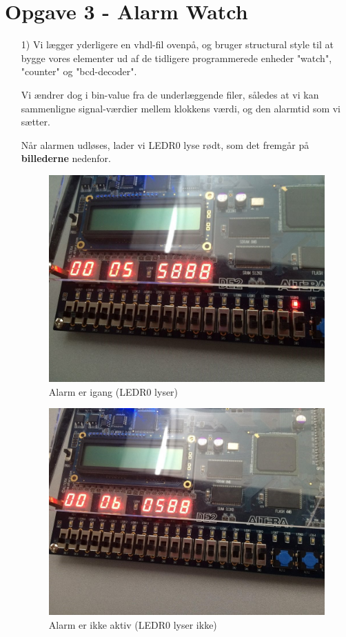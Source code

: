 \section{Opgave 3 - Alarm Watch}
\begin{enumerate}
	\item[1)]
	Vi lægger yderligere en vhdl-fil ovenpå, og bruger structural style til at bygge vores elementer ud af de tidligere programmerede enheder "watch", "counter" og "bcd-decoder". 
	
	Vi ændrer dog i bin-value fra de underlæggende filer, således at vi kan sammenligne signal-værdier mellem klokkens værdi, og den alarmtid som vi sætter. 
	
	Når alarmen udløses, lader vi LEDR0 lyse rødt, som det fremgår på \textbf{billederne} nedenfor.
	
	
		\begin{figure}[h]
			\centering
			\includegraphics[scale=0.45]{pictures/Oevelse6/opg3/AlarmOn.JPG}
			\caption{Alarm er igang (LEDR0 lyser)}
			\label{fig:alarmOn}
		\end{figure}

		\begin{figure}[h]
			\centering
			\includegraphics[scale=0.45]{pictures/Oevelse6/opg3/AlarmOff.JPG}
			\caption{Alarm er ikke aktiv (LEDR0 lyser ikke)}
			\label{fig:alarmOff}
		\end{figure}


\end{enumerate}
